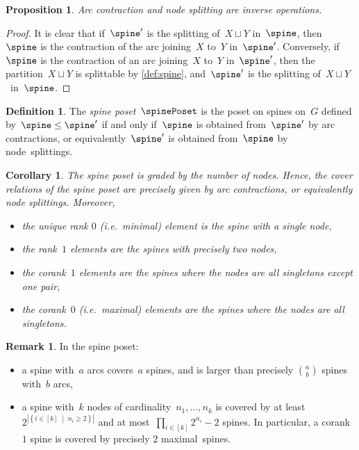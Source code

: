 \documentclass{amsart}
\newtheorem{corollary}[theorem]{Corollary}
\newtheorem{proposition}[theorem]{Proposition}
\theoremstyle{definition}
\newtheorem{definition}[theorem]{Definition}
\newtheorem{remark}[theorem]{Remark}
\newcommand{\set}[2]{\left\{ #1 \;\middle|\; #2 \right\}} %
\newcommand{\ie}{\textit{i.e.}~} %
\newcommand{\darkblue}{\color{darkblue}} %
\newcommand{\defn}[1]{\textsl{\darkblue #1}} %
\begin{document}
\begin{proposition}
  \label{prop:contractionSplitting}
  Arc contraction and node splitting are inverse operations.
\end{proposition}

\begin{proof}
  It is clear that if~$\spine'$ is the splitting of~$X \sqcup Y$ in~$\spine$, then~$\spine$ is the contraction of the arc joining~$X$ to~$Y$ in~$\spine'$.
  Conversely, if~$\spine$ is the contraction of an arc joining~$X$ to~$Y$ in~$\spine'$, then the partition~$X \sqcup Y$ is splittable by \cref{def:spine}, and~$\spine'$ is the splitting of~$X \sqcup Y$~in~$\spine$.
\end{proof}

\begin{definition}
  The \defn{spine poset}~$\spinePoset$ is the poset on spines on~$G$ defined by~$\spine \le \spine'$ if and only if~$\spine$ is obtained from~$\spine'$ by arc contractions, or equivalently~$\spine'$ is obtained from~$\spine$ by node~splittings.
\end{definition}

\begin{corollary} 
  The spine poset is graded by the number of nodes.
  Hence, the cover relations of the spine poset are precisely given by arc contractions, or equivalently node splittings.
  Moreover,
  \begin{itemize}
    \item the unique rank $0$ (\ie minimal) element is the spine with a single node, 
    \item the rank~$1$ elements are the spines with precisely two nodes, 
    \item the corank~$1$ elements are the spines where the nodes are all singletons except one pair,
    \item the corank~$0$ (\ie maximal) elements are the spines where the nodes are all singletons.
  \end{itemize}
\end{corollary}

\begin{remark}
  In the spine poset:
  \begin{itemize}
    \item a spine with~$a$ arcs covers~$a$ spines, and is larger than precisely $\binom{a}{b}$ spines with~$b$ arcs,
    \item a spine with~$k$ nodes of cardinality~$n_1, \dots, n_k$ is covered by at least~$2^{|\set{i \in [k]}{n_i \ge 2}|}$ and at most~$\prod_{i \in [k]} 2^{n_i}-2$ spines. In particular, a corank~$1$ spine is covered by precisely $2$ maximal~spines.
  \end{itemize}
\end{remark}
\end{document}
